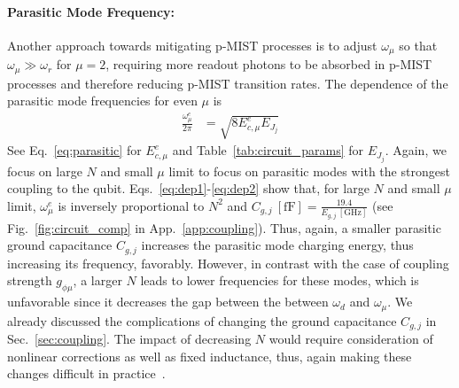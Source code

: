\documentclass[%
reprint,
superscriptaddress,
 amsmath,amssymb,
 aps,
 prx,
longbibliography,
floatfix,
]{revtex4-2}
\begin{document}
\paragraph{Parasitic Mode Frequency:}
Another approach towards mitigating p-MIST processes is to adjust $\omega_\mu$ so that $\omega_\mu \gg\omega_r$ for $\mu=2$, requiring more readout photons to be absorbed in p-MIST processes and therefore reducing p-MIST transition rates. The dependence of the parasitic mode frequencies for even $\mu$ is
\begin{align}
    \frac{\omega_\mu^e}{2\pi}&=\sqrt{8E_{c,\mu}^e E_{J_j}}
\end{align}
 See Eq.~\ref{eq:parasitic} for $E_{c,\mu}^e$ and Table~\ref{tab:circuit_params} for $E_{J_j}$. Again, we focus on large $N$ and small $\mu$ limit to focus on parasitic modes with the strongest coupling to the qubit. Eqs.~\ref{eq:dep1}-\ref{eq:dep2} show that, for large $N$ and small $\mu$ limit, $\omega_\mu^e$ is inversely proportional to $N^2$ and $C_{g,j} \ \mathrm{[fF]}=\frac{19.4}{E_{g,j} \ \mathrm{[GHz]}}$ (see Fig.~\ref{fig:circuit_comp} in App.~\ref{app:coupling}). Thus, again, a smaller parasitic ground capacitance $C_{g,j}$ increases the parasitic mode charging energy, thus increasing its frequency, favorably. However, in contrast with the case of coupling strength $g_{\phi\mu}$, a larger $N$ leads to lower frequencies for these modes, which is unfavorable since it decreases the gap between the between $\omega_d$ and $\omega_\mu$. We already discussed the complications of changing the ground capacitance $C_{g,j}$ in Sec.~\ref{sec:coupling}. The impact of decreasing $N$ would require consideration of nonlinear corrections as well as fixed inductance, thus, again making these changes difficult in practice~\cite{viola2015collective}. 
\end{document}
